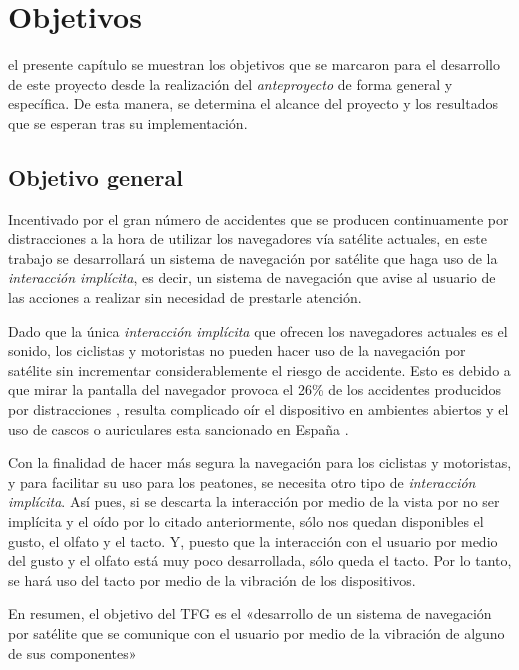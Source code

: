 \chapter{Objetivos}
\label{chap:objetivos}

 el presente capítulo se muestran los objetivos que se marcaron para el desarrollo de
este proyecto desde la realización del \emph{anteproyecto} de forma general y específica. De esta
manera, se determina el alcance del proyecto y los resultados que se esperan tras su implementación.

\section{Objetivo general}

Incentivado por el gran número de accidentes que se producen continuamente por distracciones a la
hora de utilizar los navegadores vía satélite actuales, en este trabajo se desarrollará un sistema
de navegación por satélite que haga uso de la \emph{interacción implícita}, es decir, un sistema de
navegación que avise al usuario de las acciones a realizar sin necesidad de prestarle atención.

Dado que la única \emph{interacción implícita} que ofrecen los navegadores actuales es el sonido,
los ciclistas y motoristas no pueden hacer uso de la navegación por satélite sin incrementar
considerablemente el riesgo de accidente. Esto es debido a que mirar la pantalla del navegador
provoca el 26\% de los accidentes producidos por distracciones \cite{Allianz14}, resulta complicado
oír el dispositivo en ambientes abiertos y el uso de cascos o auriculares esta sancionado en
España \cite{Serrano14}.

Con la finalidad de hacer más segura la navegación para los ciclistas y motoristas, y para facilitar
su uso para los peatones, se necesita otro tipo de \emph{interacción implícita}. Así pues, si se
descarta la interacción por medio de la vista por no ser implícita y el oído por lo citado
anteriormente, sólo nos quedan disponibles el gusto, el olfato y el tacto. Y, puesto que la
interacción con el usuario por medio del gusto y el olfato está muy poco desarrollada, sólo queda el
tacto. Por lo tanto, se hará uso del tacto por medio de la vibración de los dispositivos.

En resumen, el objetivo del \acf{TFG} es el «desarrollo de un sistema de navegación
  por satélite que se comunique con el usuario por medio de la vibración de alguno de sus
  componentes»

